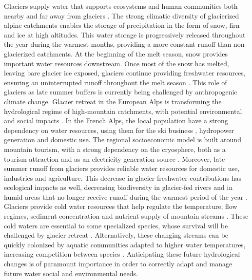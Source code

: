 Glaciers supply water that supports ecosystems and human communities both nearby and far away from glaciers \citep{ipcc_climate_2018}. The strong climatic diversity of glacierized alpine catchments enables the storage of precipitation in the form of snow, firn and ice at high altitudes. This water storage is progressively released throughout the year during the warmest months, providing a more constant runoff than non-glacierized catchments. At the beginning of the melt season, snow provides important water resources downstream. Once most of the snow has melted, leaving bare glacier ice exposed, glaciers continue providing freshwater resources, ensuring an uninterrupted runoff throughout the melt season \citep{huss_toward_2017}. This role of glaciers as late summer buffers is currently being challenged by anthropogenic climate change. Glacier retreat in the European Alps is transforming the hydrological regime of high-mountain catchments, with potential environmental and social impacts \citep{zekollari_modelling_2019}. In the French Alps, the local population have a strong dependency on water resources, using them for the ski business \citep{spandre_winter_2019}, hydropower generation and domestic use. The regional socioeconomic model is built around mountain tourism, with a strong dependency on the cryosphere, both as a tourism attraction \citep{schut_sport_2013} and as an electricity generation source \citep{schaefli_role_2019}. Moreover, late summer runoff from glaciers provides reliable water resources for domestic use, industries and agriculture. This decrease in glacier freshwater contributions has ecological impacts as well, decreasing biodiversity in glacier-fed rivers \citep{cauvy-fraunie_global_2019} and in humid areas that no longer receive runoff during the warmest period of the year \citep{carlson_monitoring_2020}. Glaciers provide cold water resources that help regulate the temperature, flow regimes, sediment concentration and nutrient supply of mountain streams \citep{huss_toward_2017}. These cold waters are essential to some specialized species, whose survival will be challenged by glacier retreat \citep{lencioni_glacial_2018, cauvy-fraunie_global_2019}.  Alternatively, these changing streams can be quickly colonized by aquatic communities adapted to higher water temperatures, increasing competition between species  \citep{robinson_ecosystem_2014}. Anticipating these future hydrological changes is of paramount importance in order to correctly adapt and manage future water social and environmental needs. 

